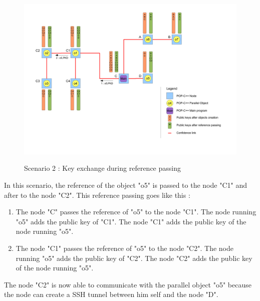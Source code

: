 \pagebreak

\begin{figure}[ht]
	\caption{Scenario 2 : Key exchange during reference passing}
  	\centering
	\includegraphics[width=1.0\textwidth]{../sc2-2.pdf}
	\label{fig:kex_ref_passing_sc2}
\end{figure}

In this scenario, the reference of the object "o5" is passed to the node "C1" and after to the node "C2". This reference passing goes like this : \s

\begin{enumerate}
\item The node "C" passes the reference of "o5" to the node "C1". The node running "o5" adds the public key of "C1". The node "C1" adds the public key of the node running "o5".
\item The node "C1" passes the reference of "o5" to the node "C2". The node running "o5" adds the public key of "C2". The node "C2" adds the public key of the node running "o5".
\end{enumerate}\s

The node "C2" is now able to communicate with the parallel object "o5" because the node can create a SSH tunnel between him self and the node "D".